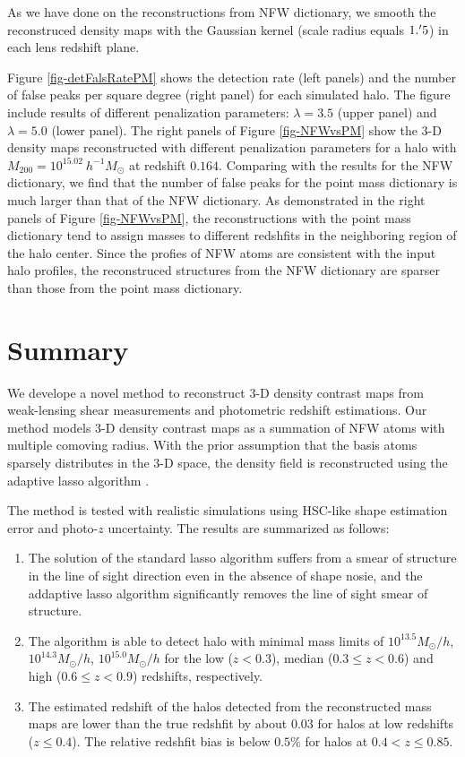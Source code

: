 \documentclass[twocolumn]{aastex62}
\begin{document}
As we have done on the reconstructions from NFW dictionary, we smooth the reconstruced density maps with the Gaussian 
kernel (scale radius equals $1.\mbox{$^\prime$} 5$) in each lens redshift plane.

Figure \ref{fig-detFalsRatePM} shows the detection rate (left panels) and the number of false peaks per square degree (right panel) 
for each simulated halo. The figure include results of different penalization parameters: $\lambda=3.5$ (upper panel) 
and $\lambda=5.0$ (lower panel). The right panels of Figure \ref{fig-NFWvsPM} show the $3$-D density maps reconstructed with 
different penalization parameters for a halo with $M_{200}=10^{15.02} ~h^{-1}M_{\odot}$ at redshift $0.164$. Comparing with
the results for the NFW dictionary, we find that the number of false peaks for the point mass dictionary is much larger than that 
of the NFW dictionary. As demonstrated in the right panels of Figure \ref{fig-NFWvsPM}, the reconstructions with the point 
mass dictionary tend to assign masses to different redshfits in the neighboring region of the halo center. Since the profies
of NFW atoms are consistent with the input halo profiles, the reconstruced structures from the NFW dictionary are sparser than
those from the point mass dictionary.

\section{Summary}
\label{sec:Sum}

We develope a novel method to reconstruct $3$-D density contrast maps from weak-lensing shear measurements and photometric
redshift estimations.
Our method models $3$-D density contrast maps as a summation of NFW atoms with multiple comoving radius. 
With the prior assumption that the basis atoms sparsely distributes in the $3$-D space, the density field is reconstructed
using the adaptive lasso algorithm \citep{AdaLASSO-Zou2006}.

The method is tested with realistic simulations using HSC-like shape estimation error and photo-$z$ uncertainty. The results
are summarized as follows:
\begin{enumerate}
 \item The solution of the standard lasso algorithm suffers from a smear of structure in the line of sight direction even in 
    the absence of shape nosie, and the addaptive lasso algorithm significantly removes the line of sight smear of structure. 
 \item The algorithm is able to detect halo with minimal mass limits of $10^{13.5} M_{\odot}/h$, $10^{14.3} M_{\odot}/h$, 
    $10^{15.0} M_{\odot}/h$ for the low ($z<0.3$), median ($0.3\leq z< 0.6$) and high ($0.6\leq z< 0.9$) redshifts, respectively.
 \item The estimated redshift of the halos detected from the reconstructed mass maps are lower than the true redshfit by about 
    $0.03$ for halos at low redshifts ($z\leq 0.4$). The relative redshfit bias is below $0.5\%$ for halos at $0.4<z\leq 0.85$. 
\end{enumerate}




\end{document}
